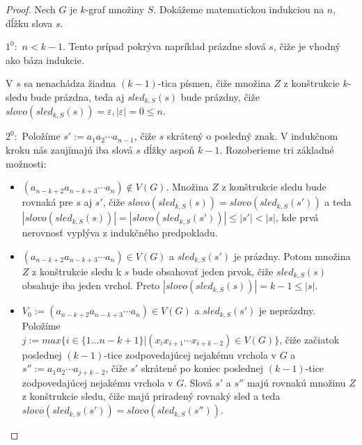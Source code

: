 \begin{proof}
    Nech $G$ je $k$-graf množiny $S$. Dokážeme matematickou indukciou na $n$, dĺžku slova $s$.

    $1^0:$  $n < k-1$. Tento prípad pokrýva napríklad prázdne slová $s$, čiže je vhodný ako báza indukcie.
            
            V $s$ sa nenachádza žiadna $(k-1)$-tica písmen, čiže množina $Z$ z konštrukcie $k$-sledu bude prázdna, teda aj $sled_{k,S}(s)$ bude
            prázdny, čiže $slovo (sled_{k,S}(s)) = \varepsilon, |\varepsilon| = 0 \leq n$.

    $2^0:$  Položíme $s' := a_1 a_2 \cdots a_{n-1}$, čiže $s$ skrátený o posledný znak. 
            V indukčnom kroku nás zaujímajú iba slová $s$ dĺžky aspoň $k - 1$. Rozoberieme tri základné možnosti:
            \begin{itemize}
                \item $(a_{n-k+2} a_{n-k+3} \cdots a_n) \notin V(G).$ Množina $Z$ z konštrukcie sledu bude rovnaká
                      pre $s$ aj $s'$, čiže $slovo(sled_{k,S}(s)) = slovo (sled_{k,S}(s'))$ a teda \\ 
                      $|slovo(sled_{k,S}(s))| = |slovo(sled_{k,S}(s'))| \leq |s'| < |s|$, kde prvá nerovnosť vyplýva z indukčného predpokladu.
                \item $(a_{n-k+2} a_{n-k+3} \cdots a_n) \in V(G)$ a $sled_{k,S}(s')$ je prázdny. Potom množina $Z$ z konštrukcie
                      sledu k $s$ bude obsahovať jeden prvok, čiže $sled_{k,S}(s)$ obsahuje iba jeden vrchol. Preto $|slovo(sled_{k,S}(s))| = k - 1 \leq |s|$.
                \item $V_0 := (a_{n-k+2} a_{n-k+3} \cdots a_n) \in V(G)$ a $sled_{k,S}(s')$ je neprázdny. Položíme \\
                      $j := max \{ i \in \{1 \ldots n - k + 1 \} | (x_i x_{i+1} \cdots x_{i+k-2}) \in V(G) \}$,
                      čiže začiatok poslednej $(k-1)$-tice zodpovedajúcej nejakému vrchola v $G$ a $s'' := a_1 a_2 \cdots a_{j+k-2}$,
                      čiže $s'$ skrátené po koniec poslednej $(k-1)$-tice zodpovedajúcej nejakému vrchola v $G$. Slová $s'$ a $s''$ majú
                      rovnakú množinu $Z$ z konštrukcie sledu, čiže majú priradený rovnaký sled a teda $slovo(sled_{k,S}(s')) = slovo(sled_{k,S}(s''))$.


\end{itemize}
\end{proof}
